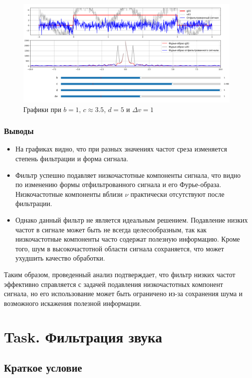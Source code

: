 \documentclass[a4paper,12pt]{article}
\begin{document}
\begin{figure}[H]  
    \centering
    \includegraphics[width=1\textwidth]{../images/1.4.7.png}
    \caption{Графики при \(b = 1\), \(c \approx 3.5\), \(d = 5\) и \(\varDelta  v = 1\)}  
    \label{fig:my_image}  
\end{figure}


\subsubsection{Выводы}

\begin{itemize}
    \item На графиках видно, что при разных значениях частот среза изменяется степень фильтрации и форма сигнала.
    \item Фильтр успешно подавляет низкочастотные компоненты сигнала, что видно по изменению формы отфильтрованного сигнала и его Фурье-образа. Низкочастотные компоненты вблизи \(\nu\) практически отсутствуют после фильтрации.
    \item Однако данный фильтр не является идеальным решением. Подавление низких частот в сигнале может быть не всегда целесообразным, так как низкочастотные компоненты часто содержат полезную информацию. Кроме того, шум в высокочастотной области сигнала сохраняется, что может ухудшить качество обработки.
\end{itemize}
Таким образом, проведенный анализ подтверждает, что фильтр низких частот эффективно справляется с задачей подавления низкочастотных компонент сигнала, но его использование может быть ограничено из-за сохранения шума и возможного искажения полезной информации.

\section{Task. Фильтрация звука}
\subsection{Краткое условие}
\end{document}
